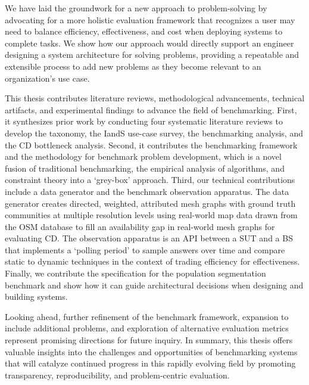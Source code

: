 We have laid the groundwork for a new approach to \gai problem-solving by advocating for a more holistic evaluation framework that recognizes a \gai user may need to balance efficiency, effectiveness, and cost when deploying systems to complete \gai tasks.
We show how our approach would directly support an engineer designing a system architecture for solving \gai problems, providing a repeatable and extensible process to add new \gai problems as they become relevant to an organization's use case.

This thesis contributes literature reviews, methodological advancements, technical artifacts, and experimental findings to advance the field of \gai benchmarking. 
First, it synthesizes prior work by conducting four systematic literature reviews to develop the \gai taxonomy, the \ac{IandS} use-case survey, the \gai benchmarking analysis, and the \ac{CD} bottleneck analysis. 
Second, it contributes the \gai benchmarking framework and the methodology for \gai benchmark problem development, which is a novel fusion of traditional benchmarking, the empirical analysis of algorithms, and constraint theory into a `grey-box' approach.
Third, our technical contributions include a data generator and the benchmark observation apparatus. 
The data generator creates directed, weighted, attributed mesh graphs with ground truth communities at multiple resolution levels using real-world map data drawn from the \ac{OSM} database to fill an availability gap in real-world mesh graphs for evaluating \ac{CD}.
The observation apparatus is an \ac{API} between a \ac{SUT} and a \ac{BS} that implements a `polling period' to sample answers over time and compare static to dynamic techniques in the context of trading efficiency for effectiveness.
Finally, we contribute the specification for the \gai population segmentation benchmark and show how it can guide architectural decisions when designing and building \gai systems.

Looking ahead, further refinement of the benchmark framework, expansion to include additional \gai problems, and exploration of alternative evaluation metrics represent promising directions for future inquiry.
In summary, this thesis offers valuable insights into the challenges and opportunities of benchmarking \gai systems that will catalyze continued progress in this rapidly evolving field by promoting transparency, reproducibility, and problem-centric evaluation.



